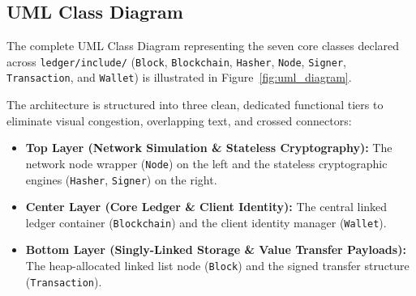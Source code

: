 \documentclass[11pt,a4paper]{report}
\begin{document}
\vfill

\clearpage

\subsection{UML Class Diagram}

The complete UML Class Diagram representing the seven core classes declared across \texttt{ledger/include/} (\texttt{Block}, \texttt{Blockchain}, \texttt{Hasher}, \texttt{Node}, \texttt{Signer}, \texttt{Transaction}, and \texttt{Wallet}) is illustrated in Figure~\ref{fig:uml_diagram}. 

The architecture is structured into three clean, dedicated functional tiers to eliminate visual congestion, overlapping text, and crossed connectors:
\begin{itemize}
    \item \textbf{Top Layer (Network Simulation \& Stateless Cryptography):} The network node wrapper (\texttt{Node}) on the left and the stateless cryptographic engines (\texttt{Hasher}, \texttt{Signer}) on the right.
    \item \textbf{Center Layer (Core Ledger \& Client Identity):} The central linked ledger container (\texttt{Blockchain}) and the client identity manager (\texttt{Wallet}).
    \item \textbf{Bottom Layer (Singly-Linked Storage \& Value Transfer Payloads):} The heap-allocated linked list node (\texttt{Block}) and the signed transfer structure (\texttt{Transaction}).
\end{itemize}

\vspace{0.6em}
\end{document}
